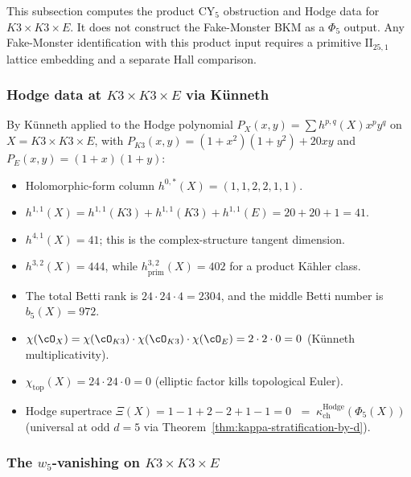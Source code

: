 \begin{warning}
This subsection computes the product CY$_5$ obstruction and Hodge data for
$K3\times K3\times E$. It does not construct the Fake-Monster BKM as a
$\Phi_5$ output. Any Fake-Monster identification with this product input
requires a primitive \(\mathrm{II}_{25,1}\) lattice embedding and a separate
Hall comparison.
\end{warning}

\subsubsection{Hodge data at \texorpdfstring{$K3 \times K3 \times E$}{K3 x K3 x E} via K\"unneth}
\label{subsubsec:phi-5-K3-K3-E-hodge}

By K\"unneth applied to the Hodge polynomial $P_X(x, y) = \sum h^{p,q}(X)
x^p y^q$ on $X = K3 \times K3 \times E$, with $P_{K3}(x, y) = (1 + x^2)(1 + y^2)
+ 20 xy$ and $P_E(x, y) = (1 + x)(1 + y)$:

\begin{itemize}
 \item Holomorphic-form column $h^{0,*}(X) = (1, 1, 2, 2, 1, 1)$.
 \item $h^{1,1}(X) = h^{1,1}(K3) + h^{1,1}(K3) + h^{1,1}(E) = 20 + 20 + 1 = 41$.
 \item $h^{4,1}(X) = 41$; this is the complex-structure tangent dimension.
 \item $h^{3,2}(X) = 444$, while
 \(h^{3,2}_{\mathrm{prim}}(X)=402\) for a product K\"ahler class.
 \item The total Betti rank is \(24\cdot 24\cdot 4=2304\), and the middle
 Betti number is \(b_5(X)=972\).
 \item $\chi(\cO_X) = \chi(\cO_{K3}) \cdot \chi(\cO_{K3}) \cdot \chi(\cO_E)
 = 2 \cdot 2 \cdot 0 = 0$ \textup{(}K\"unneth multiplicativity\textup{)}.
 \item $\chi_{\mathrm{top}}(X) = 24 \cdot 24 \cdot 0 = 0$ \textup{(}elliptic
 factor kills topological Euler\textup{)}.
 \item Hodge supertrace $\Xi(X) = 1 - 1 + 2 - 2 + 1 - 1 = 0$
 $\;=\; \kappa_{\mathrm{ch}}^{\mathrm{Hodge}}(\Phi_5(X))$ \textup{(}universal at odd $d = 5$
 via Theorem~\ref{thm:kappa-stratification-by-d}\textup{)}.
\end{itemize}

\subsubsection{The \texorpdfstring{$w_5$}{w-5}-vanishing on \texorpdfstring{$K3 \times K3 \times E$}{K3 x K3 x E}}
\label{subsubsec:phi-5-K3-K3-E-w5}


